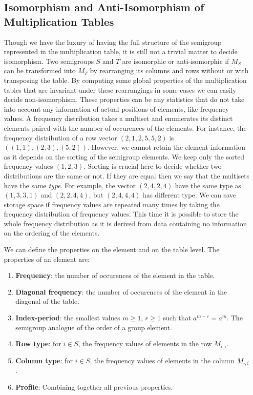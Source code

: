 \documentclass{amsart}
\theoremstyle{plain}
\theoremstyle{definition}
\begin{document}
\subsection{Isomorphism and Anti-Isomorphism of Multiplication Tables}
Though we have the luxury of having the full structure of the semigroup represented in the multiplication table, it is still not a trivial matter to decide isomorphism.
Two semigroups $S$ and $T$ are isomorphic or anti-isomorphic if $M_S$ can be transformed into $M_T$ by rearranging its columns and rows without or with transposing the table.
By computing some global properties of the multiplication tables that are invariant under these rearrangings in some cases we can easily decide non-isomorphism.
These properties can be any statistics that do not take into account any information of actual positions of elements, like frequency values.
A frequency distribution takes a multiset and enumerates its distinct elements paired with the number of occurences of the elements.
For instance, the  frequency distribution of a row vector $(2,1,2,5,5,2)$ is $((1,1),(2,3),(5,2))$.
However, we cannot retain the element information as it depends on the sorting of the semigroup elements.
We keep only the sorted frequency values $(1,2,3)$.
Sorting is crucial here to decide whether two distributions are the same or not.
If they are equal then we say that the multisets have the same \emph{type}.
For example, the vector $(2,4,2,4)$ have the same type as $(1,3,3,1)$ and $(2,2,4,4)$, but $(2,4,4,4)$ has different type.
We can save storage space if frequency values are repeated many times by taking the frequency distribution of frequency values.
This time it is possible to store the whole frequency distribution as it is derived from data containing no information on the ordering of the elements.

We can define the properties on the element and on the table level. The properties of an element are:

\begin{enumerate}
\item\textbf{Frequency}: the number of occurences of the element in the table.
\item \textbf{Diagonal frequency}: the number of occurences of the element in the diagonal of the table.
\item \textbf{Index-period}: the smallest values $m\geq 1$, $r\geq 1$ such that $a^{m+r}=a^m$. The semigroup analogue of the order of a group element.
\item \textbf{Row type}: for $i\in S$, the frequency values of elements in the row $M_{i,\square}$.
\item \textbf{Column type}:  for $i\in S$, the frequency values of elements in the column $M_{\square,i}$.
\item \textbf{Profile}: Combining together all previous properties.
\end{enumerate} 
\end{document}
